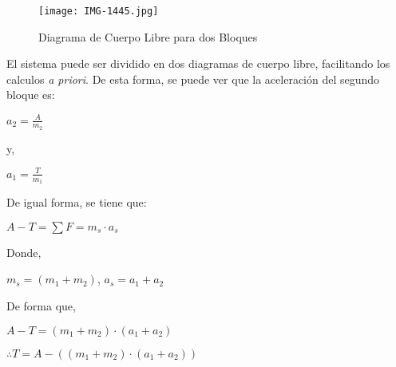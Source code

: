\documentclass[letterpaper, 12pt]{article}
\begin{document}
\begin{itemize}
\begin{figure}[h]
    \centering
    \texttt{[image: IMG-1445.jpg]}
    \caption{Diagrama de Cuerpo Libre para dos Bloques}
    \label{Diagrama_cuerpo_libre}
\end{figure}

El sistema puede ser dividido en dos diagramas de cuerpo libre, facilitando los calculos \textit{a priori}. De esta forma, se puede ver que la aceleraci\'on del segundo bloque es:

\begin{center}
    $a_2 = \frac{A}{m_2}$
\end{center}

y, 

\begin{center}
    $a_1 = \frac{T}{m_1}$
\end{center}

De igual forma, se tiene que:

\begin{center}
    $A - T = \sum F = m_s \cdot a_s$
\end{center}

Donde, 
\begin{center}
    $m_s = (m_1 + m_2)$, $a_s = a_1 + a_2$
\end{center}

De forma que,

\begin{center}
    $A - T = (m_1 + m_2)\cdot (a_1 + a_2)$
\end{center}

\begin{center}
    $\therefore T = A - ((m_1 + m_2)\cdot (a_1 + a_2))$
\end{center}

\end{itemize}
\end{document}
